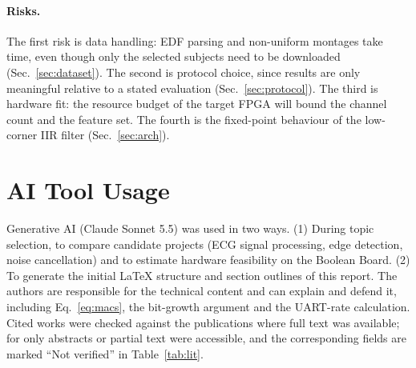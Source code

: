 \documentclass[10pt,twocolumn,letterpaper]{article}
\begin{document}

\paragraph{Risks.} The first risk is data handling: EDF parsing and
non-uniform montages take time, even though only the selected subjects
need to be downloaded (Sec.~\ref{sec:dataset}). The second is protocol
choice, since results are only meaningful relative to a stated
evaluation (Sec.~\ref{sec:protocol}). The third is hardware fit: the
resource budget of the target FPGA will bound the channel count and the
feature set. The fourth is the fixed-point behaviour of the low-corner
IIR filter (Sec.~\ref{sec:arch}).

\section*{AI Tool Usage}

Generative AI (Claude Sonnet 5.5) was used in two ways.
(1) During topic selection, to compare candidate projects (ECG signal
processing, edge detection, noise cancellation) and to estimate
hardware feasibility on the Boolean Board. (2) To generate the initial
\LaTeX{} structure and section outlines of this report. The authors are responsible for the technical
content and can explain and defend it, including
Eq.~\eqref{eq:macs}, the bit-growth argument and the UART-rate
calculation. Cited works were checked against the publications where
full text was available; for \cite{shen2022dwt,shanmugam2025ffnn,%
feng2018vlsi,alam2024qda,wen2022asic} only abstracts or partial text
were accessible, and the corresponding fields are marked ``Not
verified'' in Table~\ref{tab:lit}. 

{\small


}
\end{document}
